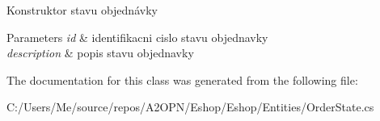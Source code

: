 Konstruktor stavu objednávky 


\begin{DoxyParams}{Parameters}
{\em id} & identifikacni cislo stavu objednavky\\
\hline
{\em description} & popis stavu objednavky\\
\hline
\end{DoxyParams}


The documentation for this class was generated from the following file\+:\begin{DoxyCompactItemize}
\item 
C\+:/\+Users/\+Me/source/repos/\+A2\+O\+P\+N/\+Eshop/\+Eshop/\+Entities/Order\+State.\+cs\end{DoxyCompactItemize}
